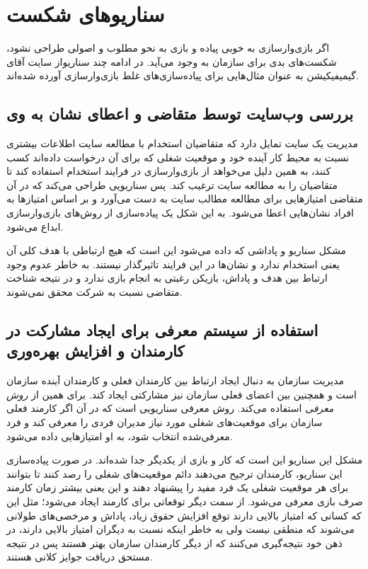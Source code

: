 \section{سناریوهای شکست}
اگر بازی‌وارسازی به خوبی پیاده و بازی به نحو مطلوب و اصولی طراحی نشود، شکست‌های بدی برای سازمان به وجود می‌آید. در ادامه چند سناریواز سایت آقای گیمیفیکیشن \cite{scenarios} به عنوان مثال‌هایی برای پیاده‌سازی‌های غلط بازی‌وارسازی آورده شده‌اند.
\subsection{بررسی وب‌سایت توسط متقاضی و اعطای نشان به وی}
مدیریت یک سایت تمایل دارد که متقاضیان استخدام با مطالعه سایت اطلاعات بیشتری نسبت به محیط کار آینده خود و موقعیت شغلی که برای آن درخواست داده‌اند کسب کنند، به همین دلیل می‌خواهد از بازی‌وارسازی در فرایند استخدام استفاده کند تا متقاضیان را به مطالعه سایت ترغیب کند. پس سناریویی طراحی می‌کند که در آن متقاضی امتیازهایی برای مطالعه مطالب سایت به دست می‌آورد و بر اساس امتیازها به افراد نشان‌هایی اعطا می‌شود. به این شکل یک پیاده‌سازی از روش‌های بازی‌وارسازی ابداع می‌شود.

مشکل سناریو و پاداشی که داده می‌شود این است که هیچ ارتباطی با هدف کلی آن یعنی استخدام ندارد و نشان‌ها در این فرایند تاثیرگذار نیستند. به خاطر عدوم وجود ارتباط بین هدف و پاداش، بازیکن رغبتی به انجام بازی ندارد و در نتیجه شناخت متقاضی نسبت به شرکت محقق نمی‌شوند.
\subsection{استفاده از سیستم معرفی برای ایجاد مشارکت در کارمندان و افزایش بهره‌وری}
مدیریت سازمان به دنبال ایجاد ارتباط بین کارمندان فعلی و کارمندان آینده سازمان است و همچنین بین اعضای فعلی سازمان نیز مشارکتی ایجاد کند. برای همین از \emph{روش معرفی }استفاده می‌کند. روش معرفی سناریویی است که در آن اگر کارمند فعلی سازمان برای موقعیت‌های شغلی مورد نیاز مدیران فردی را معرفی کند و فرد معرفی‌شده انتخاب شود، به او امتیازهایی داده می‌شود.

مشکل این سناریو این است که کار و بازی از یکدیگر جدا شده‌اند. در صورت پیاده‌سازی این سناریو، کارمندان ترجیح می‌دهند دائم موقعیت‌های شغلی را رصد کنند تا بتوانند برای هر موقعیت شغلی یک فرد مفید را پیشنهاد دهند و این یعنی بیشتر زمان کارمند صرف بازی معرفی می‌شود. از سمت دیگر توقعاتی برای کارمند ایجاد می‌شود؛ مثل این که کسانی که امتیاز بالایی دارند توقع افزایش حقوق زیاد، پاداش و مرخصی‌های طولانی می‌شوند که منطقی نیست ولی به خاطر اینکه نسبت به دیگران امتیاز بالایی دارند، در ذهن خود نتیجه‌گیری می‌کنند که از دیگر کارمندان سازمان بهتر هستند پس در نتیجه مستحق دریافت جوایز کلانی هستند.